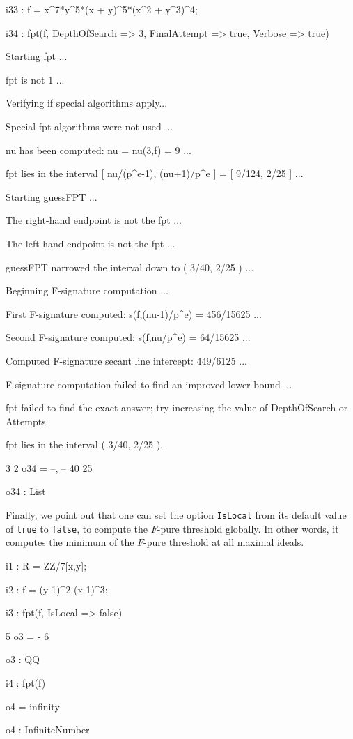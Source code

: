 \documentclass{amsart}
\begin{document}
\medspace
{\small
{}
\begin{MyVerbatim}

i33 : f = x^7*y^5*(x + y)^5*(x^2 + y^3)^4;

i34 : fpt(f, DepthOfSearch => 3, FinalAttempt => true, Verbose => true)

Starting fpt ...

fpt is not 1 ...

Verifying if special algorithms apply...

Special fpt algorithms were not used ...

nu has been computed: nu = nu(3,f) = 9 ...

fpt lies in the interval [ nu/(p^e-1), (nu+1)/p^e ] = [ 9/124, 2/25 ] ...

Starting guessFPT ...

The right-hand endpoint is not the fpt ...

The left-hand endpoint is not the fpt ...

guessFPT narrowed the interval down to ( 3/40, 2/25 ) ...

Beginning F-signature computation ...

First F-signature computed: s(f,(nu-1)/p^e) = 456/15625 ...

Second F-signature computed: s(f,nu/p^e) = 64/15625 ...

Computed F-signature secant line intercept: 449/6125 ...

F-signature computation failed to find an improved lower bound ...

fpt failed to find the exact answer; try increasing the value of
DepthOfSearch or Attempts.

fpt lies in the interval ( 3/40, 2/25 ).

        3   2
o34 = {--, --}
       40  25

o34 : List
\end{MyVerbatim}
}
\medspace

Finally, we point out that one can set the option {\tt IsLocal} from its default value of {\tt true} to {\tt false}, to compute the $F$-pure threshold globally. In other words, it computes the minimum of the $F$-pure threshold at all maximal ideals.

\medspace
{\small
{}
\begin{MyVerbatim}

i1 : R = ZZ/7[x,y];

i2 : f = (y-1)^2-(x-1)^3;

i3 : fpt(f, IsLocal => false)

     5
o3 = -
     6

o3 : QQ

i4 : fpt(f)

o4 = infinity

o4 : InfiniteNumber
\end{MyVerbatim}
}
\medspace
\end{document}
